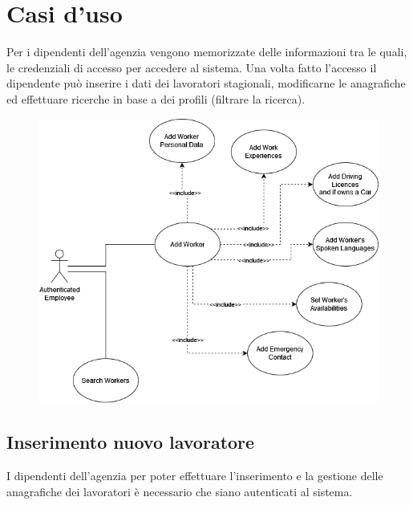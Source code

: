 \documentclass[a4paper, oneside, 12pt]{article}
\begin{document}
\newpage
\section{Casi d'uso}
Per i dipendenti dell'agenzia vengono memorizzate delle informazioni tra le quali, le credenziali di accesso per accedere al sistema. Una volta fatto l'accesso il dipendente può inserire i dati dei lavoratori stagionali, modificarne le anagrafiche ed effettuare ricerche in base a dei profili (filtrare la ricerca). 

\begin{figure}[h!]
	\centering
	\includegraphics[width = 12 cm]{images/casiduso}
	\label{fig:casi d'uso}
\end{figure}

\newpage

\subsection{Inserimento nuovo lavoratore}
I dipendenti dell'agenzia per poter effettuare l'inserimento e la gestione delle anagrafiche dei lavoratori è necessario che siano autenticati al sistema. \\

\end{document}
